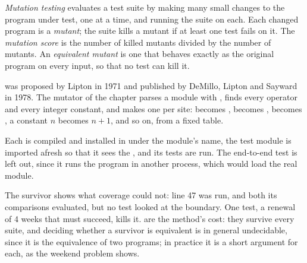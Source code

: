 \begin{definition}\label{def:b3:software-engineering:mutation}
\emph{Mutation testing} evaluates a test suite by making many small changes to the program under test, one at a time, and running the suite on each. Each changed program is a \emph{mutant}; the suite kills a mutant if at least one test fails on it. The \emph{mutation score} is the number of killed mutants divided by the number of mutants. An \emph{equivalent mutant} is one that behaves exactly as the original program on every input, so that no test can kill it.
\end{definition}

 was proposed by Lipton in 1971 and published by DeMillo, Lipton and Sayward in 1978. %
The mutator of the chapter parses a module with , finds every operator and every integer constant, and makes one  per site: \code{+} becomes \code{-}, \code{<} becomes \code{<=},  becomes , a constant $n$ becomes $n+1$, and so on, from a fixed table.

\label{lst:b3:software-engineering:mutants}

Each  is compiled and installed in  under the module's name, the test module is imported afresh so that it sees the , and its tests are run. The end-to-end test is left out, since it runs the program in another process, which would load the real module.

\label{out:b3:software-engineering:mutation}

The survivor shows what coverage could not: line 47 was run, and both its comparisons evaluated, but no test looked at the boundary. One test, a renewal of 4 weeks that must succeed, kills it.  are the method's cost: they survive every suite, and deciding whether a survivor is equivalent is in general undecidable, since it is the equivalence of two programs; in practice it is a short argument for each, as the weekend problem shows.

